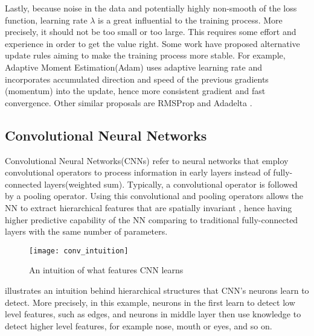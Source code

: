 Lastly, because noise in the data and potentially highly non-smooth of the loss function, learning rate $\lambda$ is a great influential to the training process. More precisely, it should not be too small or too large. This requires some effort and experience in order to get the value right. Some work have proposed alternative update rules aiming to make the training process more stable. For example,  Adaptive Moment Estimation(Adam)\cite{KingmaAdamMethodStochastic2014}  uses adaptive learning rate  and incorporates accumulated direction and speed of the previous gradients (momentum) into the update, hence more consistent gradient and fast convergence. Other similar proposals are RMSProp \cite{TielemanLectureRmsPropDivide2012} and Adadelta \cite{ZeilerADADELTAAdaptiveLearning2012}.


\subsection{Convolutional Neural Networks} \label{sec:conv}
Convolutional Neural Networks(CNNs) refer to neural networks that employ convolutional operators to process information in early layers instead of fully-connected layers(weighted sum). Typically, a convolutional operator is followed by a pooling operator. Using this convolutional and pooling operators allows the NN to extract hierarchical features that are spatially invariant \cite{ZeilerVisualizingUnderstandingConvolutional2013}, hence having higher predictive capability of the NN comparing to traditional fully-connected layers with the same number of parameters.


\begin{figure}[ht!]
    \begin{center}
		\texttt{[image: conv\_intuition]}
		\caption[]{An intuition of what features CNN learns}
		\label{fig:conv_intuition}
	\end{center}

\end{figure}

\addfigure{\ref{fig:conv_intuition}} illustrates an intuition  behind hierarchical structures that CNN's neurons learn to detect. More precisely, in this example, neurons in the first learn to detect low level features, such as edges, and neurons in middle layer then use knowledge to detect higher level features, for example nose, mouth or eyes, and so on.

